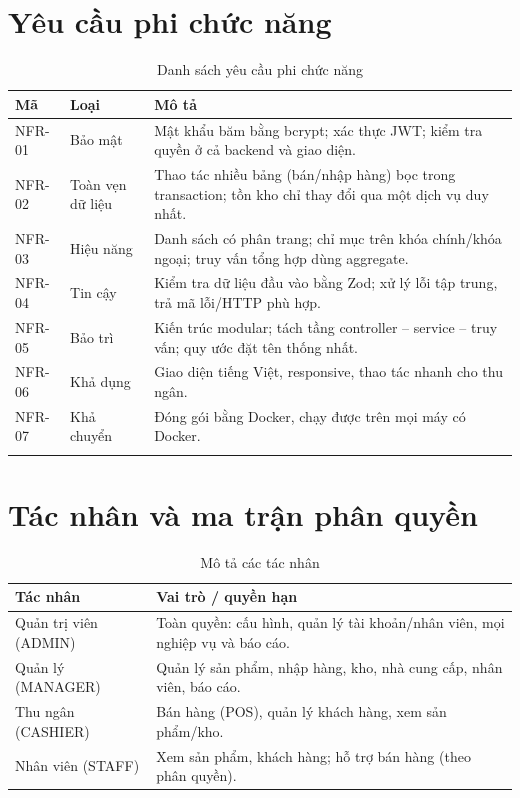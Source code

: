 \documentclass[12pt,a4paper]{report}
\begin{document}
\section{Yêu cầu phi chức năng}
\begin{longtable}{|L{1.6cm}|L{3.2cm}|L{8.2cm}|}
\hline
\textbf{Mã} & \textbf{Loại} & \textbf{Mô tả} \\ \hline
\endhead
NFR-01 & Bảo mật & Mật khẩu băm bằng bcrypt; xác thực JWT; kiểm tra quyền ở cả backend và giao diện. \\ \hline
NFR-02 & Toàn vẹn dữ liệu & Thao tác nhiều bảng (bán/nhập hàng) bọc trong transaction; tồn kho chỉ thay đổi qua một dịch vụ duy nhất. \\ \hline
NFR-03 & Hiệu năng & Danh sách có phân trang; chỉ mục trên khóa chính/khóa ngoại; truy vấn tổng hợp dùng aggregate. \\ \hline
NFR-04 & Tin cậy & Kiểm tra dữ liệu đầu vào bằng Zod; xử lý lỗi tập trung, trả mã lỗi/HTTP phù hợp. \\ \hline
NFR-05 & Bảo trì & Kiến trúc modular; tách tầng controller -- service -- truy vấn; quy ước đặt tên thống nhất. \\ \hline
NFR-06 & Khả dụng & Giao diện tiếng Việt, responsive, thao tác nhanh cho thu ngân. \\ \hline
NFR-07 & Khả chuyển & Đóng gói bằng Docker, chạy được trên mọi máy có Docker. \\ \hline
\caption{Danh sách yêu cầu phi chức năng}
\end{longtable}

\section{Tác nhân và ma trận phân quyền}
\label{sec:tacnhan}

\begin{table}[H]
\centering\small
\begin{tabularx}{\textwidth}{|L{3cm}|X|}
\hline
\textbf{Tác nhân} & \textbf{Vai trò / quyền hạn} \\ \hline
Quản trị viên (ADMIN) & Toàn quyền: cấu hình, quản lý tài khoản/nhân viên, mọi nghiệp vụ và báo cáo. \\ \hline
Quản lý (MANAGER) & Quản lý sản phẩm, nhập hàng, kho, nhà cung cấp, nhân viên, báo cáo. \\ \hline
Thu ngân (CASHIER) & Bán hàng (POS), quản lý khách hàng, xem sản phẩm/kho. \\ \hline
Nhân viên (STAFF) & Xem sản phẩm, khách hàng; hỗ trợ bán hàng (theo phân quyền). \\ \hline
\end{tabularx}
\caption{Mô tả các tác nhân}
\end{table}
\end{document}
